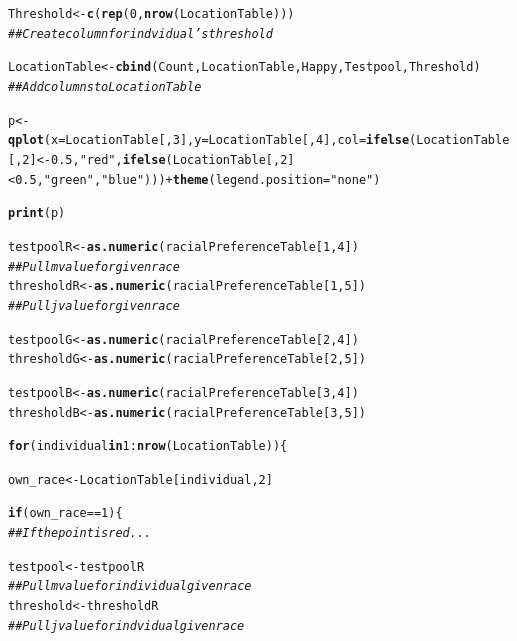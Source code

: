 \documentclass{article}\usepackage[]{graphicx}\usepackage[]{color}
\makeatletter
\newcommand{\hlnum}[1]{\textcolor[rgb]{0.686,0.059,0.569}{#1}}%
\newcommand{\hlstr}[1]{\textcolor[rgb]{0.192,0.494,0.8}{#1}}%
\newcommand{\hlcom}[1]{\textcolor[rgb]{0.678,0.584,0.686}{\textit{#1}}}%
\newcommand{\hlopt}[1]{\textcolor[rgb]{0,0,0}{#1}}%
\newcommand{\hlstd}[1]{\textcolor[rgb]{0.345,0.345,0.345}{#1}}%
\newcommand{\hlkwa}[1]{\textcolor[rgb]{0.161,0.373,0.58}{\textbf{#1}}}%
\newcommand{\hlkwb}[1]{\textcolor[rgb]{0.69,0.353,0.396}{#1}}%
\newcommand{\hlkwc}[1]{\textcolor[rgb]{0.333,0.667,0.333}{#1}}%
\newcommand{\hlkwd}[1]{\textcolor[rgb]{0.737,0.353,0.396}{\textbf{#1}}}%
\newenvironment{kframe}{%
 \def\at@end@of@kframe{}%
 \ifinner\ifhmode%
  \def\at@end@of@kframe{\end{minipage}}%
  \begin{minipage}{\columnwidth}%
 \fi\fi%
 \def\FrameCommand##1{\hskip\@totalleftmargin \hskip-\fboxsep
 \colorbox{shadecolor}{##1}\hskip-\fboxsep
     \hskip-\linewidth \hskip-\@totalleftmargin \hskip\columnwidth}%
 \MakeFramed {\advance\hsize-\width
   \@totalleftmargin\z@ \linewidth\hsize
   \@setminipage}}%
 {\par\unskip\endMakeFramed%
 \at@end@of@kframe}
\newenvironment{knitrout}{}{} %
\makeatother
\begin{document}
\begin{knitrout}
\begin{kframe}
\begin{alltt}
  \hlstd{Threshold} \hlkwb{<-} \hlkwd{c}\hlstd{(}\hlkwd{rep}\hlstd{(}\hlnum{0}\hlstd{,} \hlkwd{nrow}\hlstd{(LocationTable)))}
  \hlcom{## Create column for indvidual's threshold}

  \hlstd{LocationTable} \hlkwb{<-} \hlkwd{cbind}\hlstd{(Count, LocationTable, Happy, Testpool, Threshold)}
  \hlcom{## Add columns to Location Table}


  \hlstd{p} \hlkwb{<-} \hlkwd{qplot}\hlstd{(}\hlkwc{x} \hlstd{= LocationTable[,}\hlnum{3}\hlstd{],} \hlkwc{y} \hlstd{= LocationTable [,}\hlnum{4}\hlstd{],} \hlkwc{col} \hlstd{=} \hlkwd{ifelse}\hlstd{(LocationTable[,}\hlnum{2}\hlstd{]} \hlopt{< -}\hlnum{0.5}\hlstd{,} \hlstr{"red"}\hlstd{,} \hlkwd{ifelse}\hlstd{(LocationTable[,}\hlnum{2}\hlstd{]} \hlopt{<} \hlnum{0.5}\hlstd{,} \hlstr{"green"}\hlstd{,} \hlstr{"blue"}\hlstd{)))} \hlopt{+} \hlkwd{theme}\hlstd{(}\hlkwc{legend.position} \hlstd{=} \hlstr{"none"}\hlstd{)}

  \hlkwd{print}\hlstd{(p)}

  \hlstd{testpoolR} \hlkwb{<-} \hlkwd{as.numeric}\hlstd{(racialPreferenceTable[}\hlnum{1}\hlstd{,}\hlnum{4}\hlstd{])}
  \hlcom{## Pull m value for given race}
  \hlstd{thresholdR} \hlkwb{<-} \hlkwd{as.numeric}\hlstd{(racialPreferenceTable[}\hlnum{1}\hlstd{,}\hlnum{5}\hlstd{])}
  \hlcom{##Pull j value for given race}

  \hlstd{testpoolG} \hlkwb{<-} \hlkwd{as.numeric}\hlstd{(racialPreferenceTable[}\hlnum{2}\hlstd{,}\hlnum{4}\hlstd{])}
  \hlstd{thresholdG} \hlkwb{<-} \hlkwd{as.numeric}\hlstd{(racialPreferenceTable[}\hlnum{2}\hlstd{,}\hlnum{5}\hlstd{])}

  \hlstd{testpoolB} \hlkwb{<-} \hlkwd{as.numeric}\hlstd{(racialPreferenceTable[}\hlnum{3}\hlstd{,}\hlnum{4}\hlstd{])}
  \hlstd{thresholdB} \hlkwb{<-} \hlkwd{as.numeric}\hlstd{(racialPreferenceTable[}\hlnum{3}\hlstd{,}\hlnum{5}\hlstd{])}

  \hlkwa{for} \hlstd{(individual} \hlkwa{in} \hlnum{1}\hlopt{:}\hlkwd{nrow}\hlstd{(LocationTable))\{}

    \hlstd{own_race} \hlkwb{<-} \hlstd{LocationTable[individual,}\hlnum{2}\hlstd{]}

    \hlkwa{if}\hlstd{(own_race} \hlopt{==} \hlnum{1}\hlstd{)\{}
    \hlcom{##If the point is red...}

        \hlstd{testpool} \hlkwb{<-} \hlstd{testpoolR}
        \hlcom{## Pull m value for individual given race}
        \hlstd{threshold} \hlkwb{<-} \hlstd{thresholdR}
        \hlcom{##Pull j value for indvidual given race}


\end{alltt}
\end{kframe}
\end{knitrout}
\end{document}
